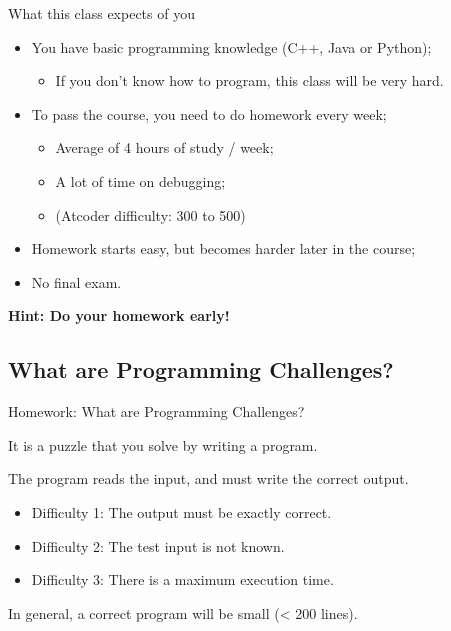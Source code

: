 \begin{frame}{What this class expects of you}
  \begin{exampleblock}{}
    \begin{itemize}
    \item You have basic programming knowledge (C++, Java or Python);
      \begin{itemize}
      \item If you don't know how to program, this class will be very hard.
      \end{itemize}
      \medskip

    \item To pass the course, you need to do homework every week;
      \begin{itemize}
        \item Average of 4 hours of study / week;
        \item A lot of time on debugging;
        \item (Atcoder difficulty: 300 to 500)
      \end{itemize}
      \medskip

      \item Homework starts easy, but becomes harder later in the course;
      \medskip

      \item No final exam.
    \end{itemize}
  \end{exampleblock}
  \hfill {\bf Hint: Do your homework early!}
\end{frame}

\subsection{What are Programming Challenges?}
\begin{frame}{Homework: What are Programming Challenges?}

  It is a puzzle that you solve by writing a program.
  \bigskip

  The program reads the input, and must write the correct output.
  \begin{itemize}
  \item Difficulty 1: The output must be \alert{exactly} correct.
  \item Difficulty 2: The test input is \alert{not known}.
  \item Difficulty 3: There is a maximum \alert{execution time}.
  \end{itemize}\bigskip

  In general, a correct program will be small (< 200 lines).
\end{frame}

